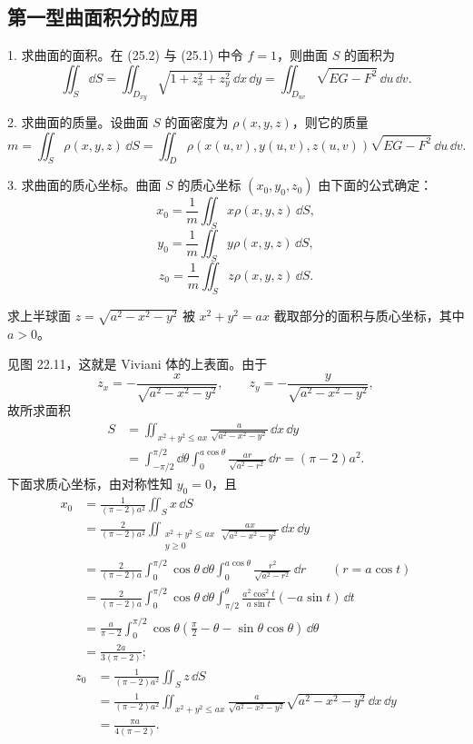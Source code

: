 \subsection{第一型曲面积分的应用}

1. 求曲面的面积。在 (25.2) 与 (25.1) 中令 $f=1$，则曲面 $S$ 的面积为
\[
  \iint_S\dd S
  =\iint_{D_{xy}}\sqrt{1+z_x^2+z_y^2}\,\dd x\,\dd y
  =\iint_{D_{uv}}\sqrt{EG-F^2}\,\dd u\,\dd v.
\]

2. 求曲面的质量。设曲面 $S$ 的面密度为 $\rho(x,y,z)$，则它的质量
\[
  m=\iint_S\rho(x,y,z)\,\dd S
  =\iint_D\rho(x(u,v),y(u,v),z(u,v))\sqrt{EG-F^2}\,\dd u\,\dd v.
\]

3. 求曲面的质心坐标。曲面 $S$ 的质心坐标 $(x_0,y_0,z_0)$ 由下面的公式确定：
\[
  x_0=\frac1m\iint_S x\rho(x,y,z)\,\dd S,
\]
\[
  y_0=\frac1m\iint_S y\rho(x,y,z)\,\dd S,
\]
\[
  z_0=\frac1m\iint_S z\rho(x,y,z)\,\dd S.
\]

\begin{xexample}[25.1.2]
求上半球面 $z=\sqrt{a^2-x^2-y^2}$ 被 $x^2+y^2=ax$ 截取部分的面积与质心坐标，其中 $a>0$。
\end{xexample}

\begin{xsolution}
见图 22.11，这就是 Viviani 体的上表面。由于
\[
  z_x=-\frac{x}{\sqrt{a^2-x^2-y^2}},\qquad
  z_y=-\frac{y}{\sqrt{a^2-x^2-y^2}},
\]
故所求面积
\begin{align*}
S&=\iint_{x^2+y^2\le ax}\frac{a}{\sqrt{a^2-x^2-y^2}}\,\dd x\,\dd y\\
&=\int_{-\pi/2}^{\pi/2}\dd\theta\int_0^{a\cos\theta}
\frac{ar}{\sqrt{a^2-r^2}}\,\dd r
=(\pi-2)a^2.
\end{align*}
下面求质心坐标，由对称性知 $y_0=0$，且
\begin{align*}
x_0&=\frac1{(\pi-2)a^2}\iint_S x\,\dd S\\
&=\frac2{(\pi-2)a^2}
\iint_{\substack{x^2+y^2\le ax\\y\ge0}}
\frac{ax}{\sqrt{a^2-x^2-y^2}}\,\dd x\,\dd y\\
&=\frac2{(\pi-2)a}\int_0^{\pi/2}\cos\theta\,\dd\theta
\int_0^{a\cos\theta}\frac{r^2}{\sqrt{a^2-r^2}}\,\dd r
\qquad(r=a\cos t)\\
&=\frac2{(\pi-2)a}\int_0^{\pi/2}\cos\theta\,\dd\theta
\int_{\pi/2}^{\theta}\frac{a^2\cos^2 t}{a\sin t}(-a\sin t)\,\dd t\\
&=\frac a{\pi-2}\int_0^{\pi/2}\cos\theta
\left(\frac\pi2-\theta-\sin\theta\cos\theta\right)\,\dd\theta\\
&=\frac{2a}{3(\pi-2)};
\end{align*}
\begin{align*}
z_0&=\frac1{(\pi-2)a^2}\iint_S z\,\dd S\\
&=\frac1{(\pi-2)a^2}\iint_{x^2+y^2\le ax}
\frac{a}{\sqrt{a^2-x^2-y^2}}\sqrt{a^2-x^2-y^2}\,\dd x\,\dd y\\
&=\frac{\pi a}{4(\pi-2)}.
\end{align*}
\end{xsolution}

